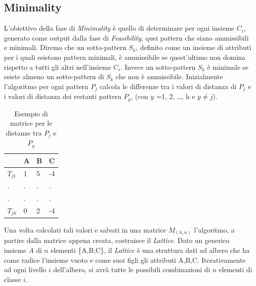 \subsection{Minimality}
L'obiettivo della fase di \emph{Minimality} è quello di determinare per ogni insieme $C_i$, generato come output dalla fase di \emph{Feasibility}, quei pattern che siano ammissibili e minimali. Diremo che un sotto-pattern $S_k$, definito come un insieme di attributi per i quali esistono pattern minimali, è ammissibile se quest'ultimo non domina rispetto a tutti gli altri nell'insieme $C_i$. Invece un sotto-pattern $S_k$ è minimale se esiste almeno un sotto-pattern di $S_k$ che non è ammissibile. Inizialmente l'algoritmo per ogni pattern $P_j$ calcola le differenze tra i valori di distanza di $P_j$ e i valori di distanza dei restanti pattern $P_y$, (con $y$ =1, 2, \ldots, h e $y \neq j$).
\begin{table}[H]
	\centering
	\begin{tabular}{ | l | l | l | l |}
		\hline
		& A & B & C \\
		\hline
		$T_{j1}$ & 1 & 5 & -4\\
		\hline
		. & . & . & .\\ 
		\hline
		. & . & . & . \\  
		\hline 
		$T_{jh}$ & 0 & 2 & -4\\ 
		\hline
	\end{tabular}
	\caption{Esempio di matrice per le distanze tra $P_j$ e $P_y$}
	\label{tab:table esempio}
\end{table}
Una volta calcolati tali valori e salvati in una matrice $M_{(h,n)}$ l'algoritmo, a partire dalla matrice appena creata, costruisce il \emph{Lattice}. Dato un generico insieme $A$ di $n$ elementi \{A,B,C\}, il \emph{Lattice} è una struttura dati ad albero che ha come radice l'insieme vuoto e come suoi figli gli attributi A,B,C. Iterativamente ad ogni livello $i$ dell'albero, si avrà tutte le possibili combinazioni di $n$ elementi di classe $i$.\\
